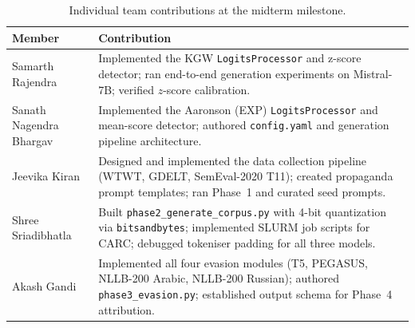 \documentclass[11pt]{article}
\begin{document}
\begin{table}[h]
\centering
\small
\begin{tabular}{@{}lp{5.5cm}@{}}
\toprule
\textbf{Member} & \textbf{Contribution} \\
\midrule
Samarth Rajendra
  & Implemented the KGW \texttt{LogitsProcessor} and z-score detector;
    ran end-to-end generation experiments on Mistral-7B; verified
    $z$-score calibration. \\[4pt]
Sanath Nagendra Bhargav
  & Implemented the Aaronson (EXP) \texttt{LogitsProcessor} and
    mean-score detector; authored \texttt{config.yaml} and
    generation pipeline architecture. \\[4pt]
Jeevika Kiran
  & Designed and implemented the data collection pipeline (WTWT,
    GDELT, SemEval-2020 T11); created propaganda prompt templates;
    ran Phase~1 and curated seed prompts. \\[4pt]
Shree Sriadibhatla
  & Built \texttt{phase2\_generate\_corpus.py} with 4-bit quantization
    via \texttt{bitsandbytes}; implemented SLURM job scripts for CARC;
    debugged tokeniser padding for all three models. \\[4pt]
Akash Gandi
  & Implemented all four evasion modules (T5, PEGASUS,
    NLLB-200 Arabic, NLLB-200 Russian); authored
    \texttt{phase3\_evasion.py}; established
    output schema for Phase~4 attribution. \\
\bottomrule
\end{tabular}
\caption{Individual team contributions at the midterm milestone.}
\label{tab:contributions}
\end{table}


\end{document}
